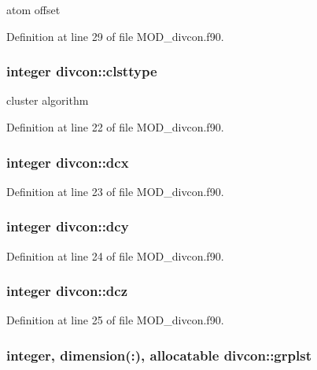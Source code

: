 atom offset 



Definition at line 29 of file M\-O\-D\-\_\-divcon.\-f90.

\hypertarget{classdivcon_ae45ec52c665839ab4eb37dd153149e30}{
\subsubsection[{clsttype}]{\setlength{\rightskip}{0pt plus 5cm}integer divcon\-::clsttype}}\label{classdivcon_ae45ec52c665839ab4eb37dd153149e30}


cluster algorithm 



Definition at line 22 of file M\-O\-D\-\_\-divcon.\-f90.

\hypertarget{classdivcon_a6a2fe3c40a79e9864b137eae55c5f687}{
\subsubsection[{dcx}]{\setlength{\rightskip}{0pt plus 5cm}integer divcon\-::dcx}}\label{classdivcon_a6a2fe3c40a79e9864b137eae55c5f687}


Definition at line 23 of file M\-O\-D\-\_\-divcon.\-f90.

\hypertarget{classdivcon_addaa1eb83cb76de9e77d18be1572e1bc}{
\subsubsection[{dcy}]{\setlength{\rightskip}{0pt plus 5cm}integer divcon\-::dcy}}\label{classdivcon_addaa1eb83cb76de9e77d18be1572e1bc}


Definition at line 24 of file M\-O\-D\-\_\-divcon.\-f90.

\hypertarget{classdivcon_a57e33b1ad8fb8c9cd294d6ebb7be1733}{
\subsubsection[{dcz}]{\setlength{\rightskip}{0pt plus 5cm}integer divcon\-::dcz}}\label{classdivcon_a57e33b1ad8fb8c9cd294d6ebb7be1733}


Definition at line 25 of file M\-O\-D\-\_\-divcon.\-f90.

\hypertarget{classdivcon_a3a01a2319abc05a8446408112da13898}{
\subsubsection[{grplst}]{\setlength{\rightskip}{0pt plus 5cm}integer, dimension(\-:), allocatable divcon\-::grplst}}\label{classdivcon_a3a01a2319abc05a8446408112da13898}


